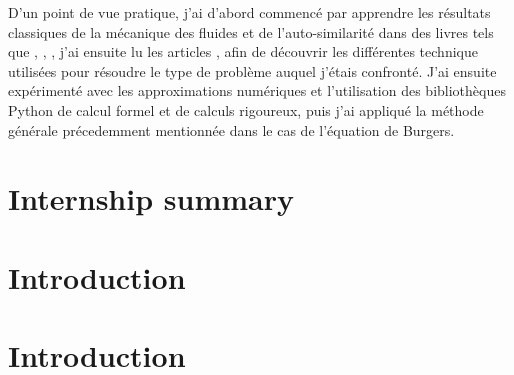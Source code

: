 \documentclass[11pt,a4paper]{article}
\begin{document}
D'un point de vue pratique, j'ai d'abord commencé par apprendre les résultats classiques de la mécanique des fluides et de l'auto-similarité dans des livres tels que \cite{majda2001vorticity}, \cite{eggers2015singularities}, \cite{tao2006dispersive}, j'ai ensuite lu les articles \cite{buckmaster2019formation},\cite{buckmaster2022imploding} afin de découvrir les différentes technique utilisées pour résoudre le type de problème auquel j'étais confronté. J'ai ensuite expérimenté avec les approximations numériques et l'utilisation des bibliothèques Python de calcul formel et de calculs rigoureux, puis j'ai appliqué la méthode générale précedemment mentionnée dans le cas de l'équation de Burgers.

\newpage
{\centering
\section*{Internship summary}
}

\newpage
{\centering
\section*{Introduction}

}
\section{Introduction}

\end{document}
